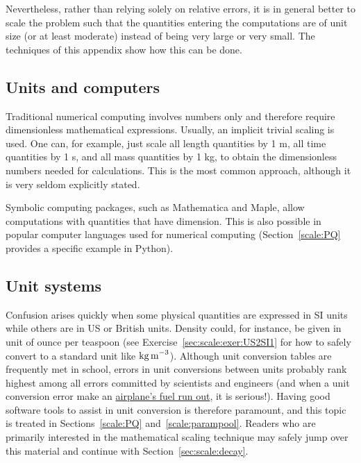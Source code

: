 \documentclass[graybox,envcountchap,sectrefs,final]{svmonodo}
\begin{document}
Nevertheless, rather than relying solely on relative errors, it is in general
better to scale the problem such that the quantities entering the
computations are of unit size (or at least moderate) instead of being very
large or very small. The techniques of this appendix show how this
can be done.

\subsection{Units and computers}

Traditional numerical computing involves numbers only and therefore
require dimensionless mathematical expressions. Usually, an implicit
trivial scaling is used. One can, for example, just scale all length
quantities by 1 m, all time quantities by 1 s, and all mass quantities
by 1 kg, to obtain the dimensionless numbers needed for calculations.
This is the most common approach, although it is very seldom explicitly
stated.

Symbolic computing packages, such as Mathematica and Maple, allow
computations with quantities that have dimension. This is also possible
in popular computer languages used for numerical computing (Section~\ref{scale:PQ} provides a specific example in Python).


\subsection{Unit systems}


Confusion arises quickly when some physical quantities are expressed
in SI units while others are in US or British units.  Density could,
for instance, be given in unit of ounce per teaspoon (see Exercise~\ref{sec:scale:exer:US2SI1} for how to safely convert to a standard
unit like $\hbox{kg\,m}^{-3}$).  Although unit conversion tables are
frequently met in school, errors in unit conversions between units
probably rank highest among all errors committed by scientists and
engineers (and when a unit conversion error make an \href{{http://www.nytimes.com/1983/07/30/us/jet-s-fuel-ran-out-after-metric-conversion-errors.html}}{airplane's fuel
run out},
it is serious!).  Having good software tools to assist in unit
conversion is therefore paramount, and this topic is treated in
Sections~\ref{scale:PQ} and~\ref{scale:parampool}.  Readers who are
primarily interested in the mathematical scaling technique may safely
jump over this material and continue with Section~\ref{sec:scale:decay}.
\end{document}

